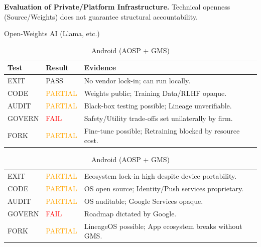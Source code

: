 \begin{table}[htbp]
    \centering
    \caption{\textbf{Evaluation of Private/Platform Infrastructure.} Technical openness (Source/Weights) does not guarantee structural accountability.}
    \label{tab:corp_infra}

    \begin{subtable}{1\textwidth}
        \centering
        \caption{Open-Weights AI (Llama, etc.)}
        \small
        \begin{tabular}{@{}llp{8.5cm}@{}}
            \toprule
            \textbf{Test} & \textbf{Result} & \textbf{Evidence} \\
            \midrule
            EXIT & \textcolor{green!50!black}{PASS} & No vendor lock-in; can run locally. \\
            CODE & \textcolor{orange}{PARTIAL} & Weights public; Training Data/RLHF opaque. \\
            AUDIT & \textcolor{orange}{PARTIAL} & Black-box testing possible; Lineage unverifiable. \\
            GOVERN & \textcolor{red}{FAIL} & Safety/Utility trade-offs set unilaterally by firm. \\
            FORK & \textcolor{orange}{PARTIAL} & Fine-tune possible; Retraining blocked by resource cost. \\
            \bottomrule
        \end{tabular}
        \vspace{0.3cm}
    \end{subtable}

    \begin{subtable}{1\textwidth}
        \centering
        \caption{Android (AOSP + GMS)}
        \small
        \begin{tabular}{@{}llp{8.5cm}@{}}
            \toprule
            EXIT & \textcolor{orange}{PARTIAL} & Ecosystem lock-in high despite device portability. \\
            CODE & \textcolor{orange}{PARTIAL} & OS open source; Identity/Push services proprietary. \\
            AUDIT & \textcolor{orange}{PARTIAL} & OS auditable; Google Services opaque. \\
            GOVERN & \textcolor{red}{FAIL} & Roadmap dictated by Google. \\
            FORK & \textcolor{orange}{PARTIAL} & LineageOS possible; App ecosystem breaks without GMS. \\
            \bottomrule
        \end{tabular}
        \vspace{0.3cm}
    \end{subtable}


\end{table}

